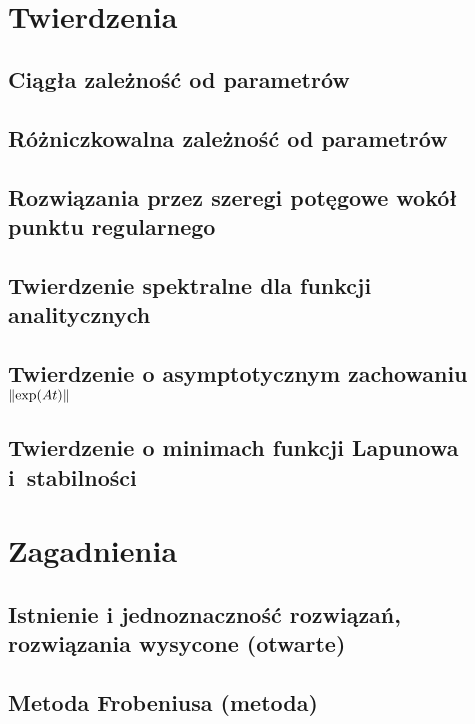 



  \maketitle
  \newpage~
  \thispagestyle{empty}
  \tableofcontents
  
  \chapter{Twierdzenia}
    \section{Ciągła zależność od parametrów}
      
    \section{Różniczkowalna zależność od parametrów}
      
    \section{Rozwiązania przez szeregi potęgowe wokół punktu regularnego}
      
    \section{Twierdzenie spektralne dla funkcji analitycznych}
      
    \section{Twierdzenie o asymptotycznym zachowaniu $ \lVert\exp(At)\rVert $}
      
    \section{Twierdzenie o minimach funkcji Lapunowa i~stabilności}
    
  \chapter{Zagadnienia}
    \section{Istnienie i jednoznaczność rozwiązań, rozwiązania wysycone (otwarte)}
      
    \section{Metoda Frobeniusa (metoda)}
      
